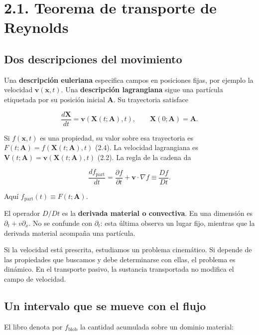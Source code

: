 \documentclass[11pt,a4paper]{article}
\begin{document}
\hypertarget{teorema-de-transporte-de-reynolds}{%
\section{2.1. Teorema de transporte de
Reynolds}\label{teorema-de-transporte-de-reynolds}}

\hypertarget{dos-descripciones-del-movimiento}{%
\subsection{Dos descripciones del
movimiento}\label{dos-descripciones-del-movimiento}}

Una \textbf{descripción euleriana} especifica campos en posiciones
fijas, por ejemplo la velocidad \(\mathbf v(\mathbf x,t)\). Una
\textbf{descripción lagrangiana} sigue una partícula etiquetada por su
posición inicial \(\mathbf A\). Su trayectoria satisface

\[\frac{d\mathbf X}{dt}=\mathbf v(\mathbf X(t;\mathbf A),t),\qquad \mathbf X(0;\mathbf A)=\mathbf A.\]

Si \(f(\mathbf x,t)\) es una propiedad, su valor sobre esa trayectoria
es \(F(t;\mathbf A)=f(\mathbf X(t;\mathbf A),t)\) (2.4). La velocidad
lagrangiana es
\(\mathbf V(t;\mathbf A)=\mathbf v(\mathbf X(t;\mathbf A),t)\) (2.2). La
regla de la cadena da

\[\frac{df_{\mathrm{part}}}{dt}=\frac{\partial f}{\partial t}+\mathbf v\cdot\nabla f\equiv\frac{Df}{Dt}.\tag{2.5}\]

Aquí \(f_{\mathrm{part}}(t)\equiv F(t;\mathbf A)\).

El operador \(D/Dt\) es la \textbf{derivada material o convectiva}. En
una dimensión es \(\partial_t+v\partial_x\). No se confunde con
\(\partial_t\): esta última observa un lugar fijo, mientras que la
derivada material acompaña una partícula.

Si la velocidad está prescrita, estudiamos un problema cinemático. Si
depende de las propiedades que buscamos y debe determinarse con ellas,
el problema es dinámico. En el transporte pasivo, la sustancia
transportada no modifica el campo de velocidad.

\hypertarget{un-intervalo-que-se-mueve-con-el-flujo}{%
\subsection{Un intervalo que se mueve con el
flujo}\label{un-intervalo-que-se-mueve-con-el-flujo}}

El libro denota por \(f_{\mathrm{blob}}\) la cantidad acumulada sobre un
dominio material:
\end{document}
